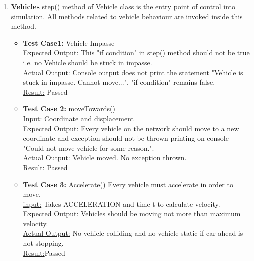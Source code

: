 \documentclass[11pt]{article}
\begin{document}
\begin{enumerate}
\begin{itemize}
\begin{enumerate}%
\item\textbf {Vehicles}
step() method of Vehicle class is the entry point of control into simulation. All methods related to vehicle behaviour are invoked inside this method.\hfill \\



\begin{itemize} %
\item \textbf{Test Case1:} \hspace{6 mm} Vehicle Impasse\hfill \\
\underline{Expected Output: }\hspace{6 mm}This "if condition" in step() method should not be true i.e. no Vehicle should be stuck in impasse.\hfill \\
\underline{Actual Output:} \hspace{6 mm}Console output does not print the statement "Vehicle is stuck in impasse. Cannot move...". "if condition" remains false.\hfill \\
\underline{Result:} Passed\hfill \\



\item \textbf{Test Case 2:} \hspace{6 mm}moveTowards()\hfill \\
\underline{Input:} \hspace{6 mm}Coordinate and displacement\hfill \\
\underline{Expected Output:} \hspace{6 mm}Every vehicle on the network should move to a new coordinate and exception should not be thrown printing on console "Could not move vehicle for some reason.". \hfill \\
\underline{Actual Output:} \hspace{6 mm}Vehicle moved. No exception thrown.\hfill \\
\underline{Result:} \hspace{6 mm}Passed\hfill \\
\item \textbf{Test Case 3:} \hspace{6 mm}Accelerate() Every vehicle must accelerate in order to move.\hfill \\
\underline{input:} \hspace{6 mm}Takes ACCELERATION and time t to calculate velocity.\hfill \\
\underline{Expected Output:} \hspace{6 mm}Vehicles should be moving not more than maximum velocity.\hfill \\
\underline{Actual Output:} \hspace{6 mm}No vehicle colliding and no vehicle static if car ahead is not stopping.\hfill \\
\underline{Result:}Passed\hfill \\


\end{itemize}
\end{enumerate}
\end{itemize}
\end{enumerate}
\end{document}
